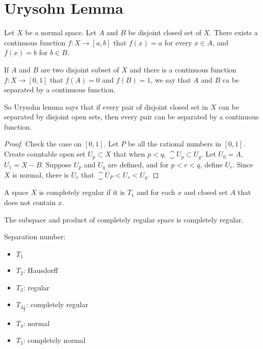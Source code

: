 
\section{Urysohn Lemma}

\begin{theorem}
    Let $X$ be a normal space. Let $A$ and $B$ be disjoint closed set of $X$. There exists a continuous function $f: X \rightarrow [a,b]$ that $f(x) = a$ for every $x \in A$, and $f(x) = b$ for $b \in B$.
    
    If $A$ and $B$ are two disjoint subset of $X$ and there is a continuous function $f: X \rightarrow [0,1]$ that $f(A) = {0}$ and $f(B) = {1}$, we say that $A$ and $B$ ca be separated by a continuous function.
    
    So Urysohn lemma says that if every pair of disjoint closed set in $X$ can be separated by disjoint open sets, then every pair can be separated by a continuous function.
\end{theorem}
\begin{proof}
    Check the case on $[0,1]$. Let $P$ be all the rational numbers in $[0,1]$. Create countable open set $U_p \subset X$ that when $p < q$, $\closure{U_p} \subset U_q$. Let $U_0 = A$, $U_1 = X - B$. Suppose $U_p$ and $U_q$ are defined, and for $p < r < q$, define $U_r$. Since $X$ is normal, there is $U_r$ that $\closure{U_P} < U_r < U_q$. 
\end{proof}

\begin{definition}
    A space $X$ is completely regular if it is $T_1$ and for each $x$ and closed set $A$ that does not contain $x$.
\end{definition}

\begin{theorem}
    The subspace and product of completely regular space is completely regular.    
\end{theorem}

\begin{definition}
    Separation number:
    \begin{itemize}
        \item $T_1$
        \item $T_2$: Hausdorff
        \item $T_3$: regular
        \item $T_{3 \frac{1}{2}}$: completely regular
        \item $T_4$: normal
        \item $T_5$: completely normal
    \end{itemize}
\end{definition}


